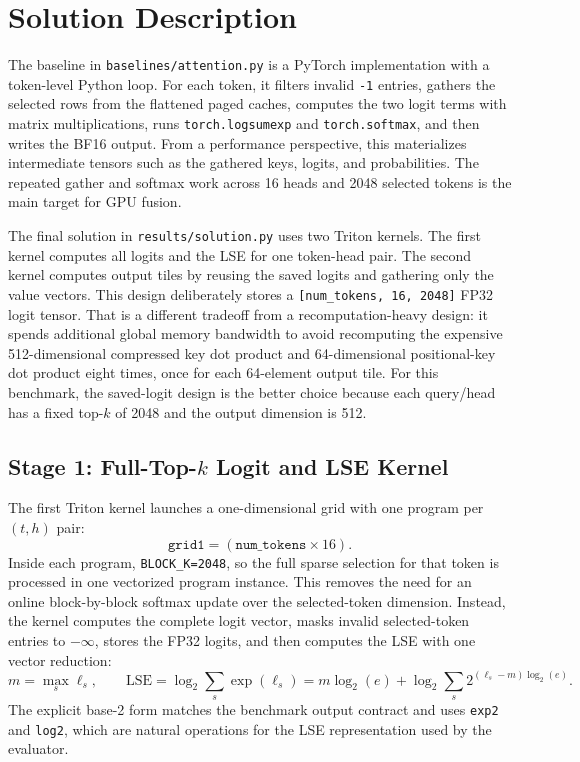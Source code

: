 \documentclass{article}
\begin{document}
\section{Solution Description}

The baseline in \texttt{baselines/attention.py} is a PyTorch implementation with a
token-level Python loop. For each token, it filters invalid \texttt{-1} entries, gathers
the selected rows from the flattened paged caches, computes the two logit terms with
matrix multiplications, runs \texttt{torch.logsumexp} and \texttt{torch.softmax}, and
then writes the BF16 output. From a performance perspective, this materializes
intermediate tensors such as the gathered keys, logits, and probabilities. The repeated
gather and softmax work across 16 heads and 2048 selected tokens is the main target for
GPU fusion.

The final solution in \texttt{results/solution.py} uses two Triton kernels. The first
kernel computes all logits and the LSE for one token-head pair. The second kernel
computes output tiles by reusing the saved logits and gathering only the value vectors.
This design deliberately stores a \texttt{[num\_tokens, 16, 2048]} FP32 logit tensor.
That is a different tradeoff from a recomputation-heavy design: it spends additional
global memory bandwidth to avoid recomputing the expensive 512-dimensional compressed
key dot product and 64-dimensional positional-key dot product eight times, once for
each 64-element output tile. For this benchmark, the saved-logit design is the better
choice because each query/head has a fixed top-$k$ of 2048 and the output dimension is
512.

\subsection{Stage 1: Full-Top-$k$ Logit and LSE Kernel}

The first Triton kernel launches a one-dimensional grid with one program per
$(t,h)$ pair:
\[
\texttt{grid1}=(\texttt{num\_tokens}\times 16).
\]
Inside each program, \texttt{BLOCK\_K=2048}, so the full sparse selection for that
token is processed in one vectorized program instance. This removes the need for an
online block-by-block softmax update over the selected-token dimension. Instead, the
kernel computes the complete logit vector, masks invalid selected-token entries to
$-\infty$, stores the FP32 logits, and then computes the LSE with one vector reduction:
\[
m=\max_s \ell_s,\qquad
\mathrm{LSE}=\log_2\sum_s \exp(\ell_s)
          = m\log_2(e)+\log_2\sum_s 2^{(\ell_s-m)\log_2(e)}.
\]
The explicit base-2 form matches the benchmark output contract and uses \texttt{exp2}
and \texttt{log2}, which are natural operations for the LSE representation used by the
evaluator.
\end{document}

